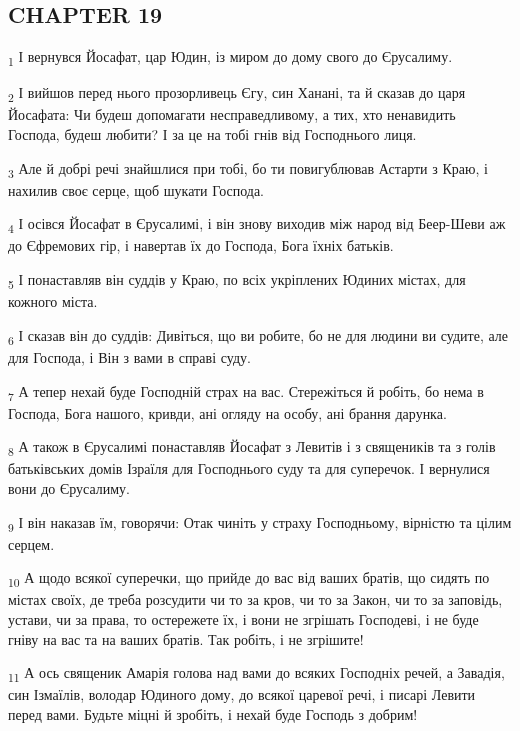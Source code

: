 \subsection{CHAPTER 19}
\begin{tcolorbox}
\textsubscript{1} І вернувся Йосафат, цар Юдин, із миром до дому свого до Єрусалиму.
\end{tcolorbox}
\begin{tcolorbox}
\textsubscript{2} І вийшов перед нього прозорливець Єгу, син Ханані, та й сказав до царя Йосафата: Чи будеш допомагати несправедливому, а тих, хто ненавидить Господа, будеш любити? І за це на тобі гнів від Господнього лиця.
\end{tcolorbox}
\begin{tcolorbox}
\textsubscript{3} Але й добрі речі знайшлися при тобі, бо ти повигублював Астарти з Краю, і нахилив своє серце, щоб шукати Господа.
\end{tcolorbox}
\begin{tcolorbox}
\textsubscript{4} І осівся Йосафат в Єрусалимі, і він знову виходив між народ від Беер-Шеви аж до Єфремових гір, і навертав їх до Господа, Бога їхніх батьків.
\end{tcolorbox}
\begin{tcolorbox}
\textsubscript{5} І понаставляв він суддів у Краю, по всіх укріплених Юдиних містах, для кожного міста.
\end{tcolorbox}
\begin{tcolorbox}
\textsubscript{6} І сказав він до суддів: Дивіться, що ви робите, бо не для людини ви судите, але для Господа, і Він з вами в справі суду.
\end{tcolorbox}
\begin{tcolorbox}
\textsubscript{7} А тепер нехай буде Господній страх на вас. Стережіться й робіть, бо нема в Господа, Бога нашого, кривди, ані огляду на особу, ані брання дарунка.
\end{tcolorbox}
\begin{tcolorbox}
\textsubscript{8} А також в Єрусалимі понаставляв Йосафат з Левитів і з священиків та з голів батьківських домів Ізраїля для Господнього суду та для суперечок. І вернулися вони до Єрусалиму.
\end{tcolorbox}
\begin{tcolorbox}
\textsubscript{9} І він наказав їм, говорячи: Отак чиніть у страху Господньому, вірністю та цілим серцем.
\end{tcolorbox}
\begin{tcolorbox}
\textsubscript{10} А щодо всякої суперечки, що прийде до вас від ваших братів, що сидять по містах своїх, де треба розсудити чи то за кров, чи то за Закон, чи то за заповідь, устави, чи за права, то остережете їх, і вони не згрішать Господеві, і не буде гніву на вас та на ваших братів. Так робіть, і не згрішите!
\end{tcolorbox}
\begin{tcolorbox}
\textsubscript{11} А ось священик Амарія голова над вами до всяких Господніх речей, а Завадія, син Ізмаїлів, володар Юдиного дому, до всякої царевої речі, і писарі Левити перед вами. Будьте міцні й зробіть, і нехай буде Господь з добрим!
\end{tcolorbox}
